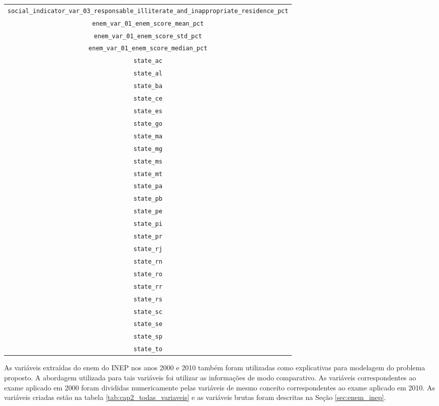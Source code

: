 \begin{table}[h]
\begin{adjustbox}{height=8.0cm}
\begin{tabular}{c}
\scriptsize \verb|social_indicator_var_03_responsable_illiterate_and_inappropriate_residence_pct| \\
\scriptsize \verb|enem_var_01_enem_score_mean_pct| \\
\scriptsize \verb|enem_var_01_enem_score_std_pct| \\
\scriptsize \verb|enem_var_01_enem_score_median_pct| \\
\scriptsize \verb|state_ac| \\
\scriptsize \verb|state_al| \\
\scriptsize \verb|state_ba| \\
\scriptsize \verb|state_ce| \\
\scriptsize \verb|state_es| \\
\scriptsize \verb|state_go| \\
\scriptsize \verb|state_ma| \\
\scriptsize \verb|state_mg| \\
\scriptsize \verb|state_ms| \\
\scriptsize \verb|state_mt| \\
\scriptsize \verb|state_pa| \\
\scriptsize \verb|state_pb| \\
\scriptsize \verb|state_pe| \\
\scriptsize \verb|state_pi| \\
\scriptsize \verb|state_pr| \\
\scriptsize \verb|state_rj| \\
\scriptsize \verb|state_rn| \\
\scriptsize \verb|state_ro| \\
\scriptsize \verb|state_rr| \\
\scriptsize \verb|state_rs| \\
\scriptsize \verb|state_sc| \\
\scriptsize \verb|state_se| \\
\scriptsize \verb|state_sp| \\
\scriptsize \verb|state_to| \\
\hline
\end{tabular}
\end{adjustbox}
\end{table}
\FloatBarrier

As variáveis extraídas do enem do INEP nos anos 2000 e 2010 também foram utilizadas como explicativas para modelagem do problema proposto. A abordagem utilizada para tais variáveis foi utilizar as informações de modo comparativo. As variáveis correspondentes ao exame aplicado em 2000 foram divididas numericamente pelas variáveis de mesmo conceito correspondentes ao exame aplicado em 2010. As variáveis criadas estão na tabela \ref{tab:cap2_todas_variaveis} e as variáveis brutas foram descritas na Seção \ref{sec:enem_inep}.

